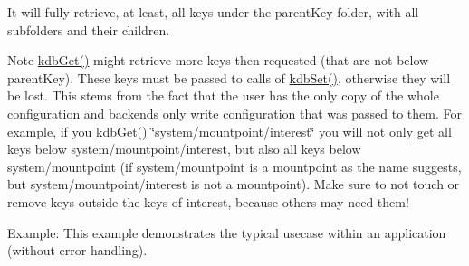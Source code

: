 It will fully retrieve, at least, all keys under the {\ttfamily parent\-Key} folder, with all subfolders and their children.

\begin{DoxyNote}{Note}
\hyperlink{group__kdb_ga28e385fd9cb7ccfe0b2f1ed2f62453a1}{kdb\-Get()} might retrieve more keys then requested (that are not below parent\-Key). These keys must be passed to calls of \hyperlink{group__kdb_ga11436b058408f83d303ca5e996832bcf}{kdb\-Set()}, otherwise they will be lost. This stems from the fact that the user has the only copy of the whole configuration and backends only write configuration that was passed to them. For example, if you \hyperlink{group__kdb_ga28e385fd9cb7ccfe0b2f1ed2f62453a1}{kdb\-Get()} \char`\"{}system/mountpoint/interest\char`\"{} you will not only get all keys below system/mountpoint/interest, but also all keys below system/mountpoint (if system/mountpoint is a mountpoint as the name suggests, but system/mountpoint/interest is not a mountpoint). Make sure to not touch or remove keys outside the keys of interest, because others may need them!
\end{DoxyNote}
\begin{DoxyParagraph}{Example\-:}
This example demonstrates the typical usecase within an application (without error handling).
\end{DoxyParagraph}

